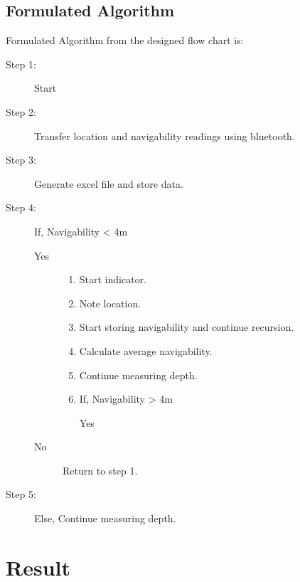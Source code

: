 \documentclass[12pt, top = 1 inch, bottom = 1 inch, left = 1.2 inch, top = .8 inch]{book}
\begin{document}
			\section{Formulated Algorithm}
			Formulated Algorithm from the designed flow chart is:
			\begin{description}
				\item[Step 1: ] Start
				\item[Step 2: ] Transfer location and navigability readings using bluetooth.
				\item[Step 3: ] Generate excel file and store data.
				\item[Step 4: ]	If, Navigability < 4m
					\begin{description}
						\item[Yes ]
						\begin{enumerate}
							\item Start indicator.
							\item Note location.
							\item Start storing navigability and continue recursion.
							\item Calculate average navigability.
							\item Continue measuring depth.
							\item If, Navigability > 4m
							\begin{description}
								\item[Yes ]
							\end{description} 
						\end{enumerate}
						\item[No ] Return to step 1.
					\end{description}
				\item[Step 5: ] Else, Continue measuring depth.
			\end{description}
		\chapter{Result}
\end{document}
